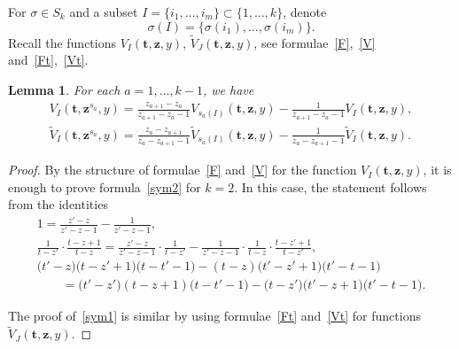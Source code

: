 \documentclass[10pt,a4paper]{amsart}
\numberwithin{equation}{section}
\newtheorem{Lemma}[Theorem]{Lemma}
\begin{document}
For $\sigma\in S_k$ and a subset $I=\{i_1,\dots,i_m\}\subset\{1,\dots,k\}$, denote
\begin{equation*}\sigma (I)=\{\sigma(i_1),\dots,\sigma(i_m)\}.\end{equation*}
Recall the functions $V_I(\boldsymbol{t},\boldsymbol{z},y)$, $\widetilde{V}_J(\boldsymbol{t},\boldsymbol{z},y)$, see formulae~\eqref{F},~\eqref{V} and~\eqref{Ft},~\eqref{Vt}.

\begin{Lemma}
For each $a=1,\dots, k-1$, we have
\begin{gather}\label{sym2}
V_{I}(\boldsymbol{t},\boldsymbol{z}^{s_a}\!,y)=\frac{z_{a+1}-z_a}{z_{a+1}-z_{a}-1}V_{s_a(I)}(\boldsymbol{t},\boldsymbol{z},y)-\frac{1}{z_{a+1}-z_{a}-1}V_{I}(\boldsymbol{t},\boldsymbol{z},y),
\\ \label{sym1}
\widetilde{V}_I(\boldsymbol{t},\boldsymbol{z}^{s_a}\!,y)=\frac{z_a-z_{a+1}}{z_a-z_{a+1}-1}\widetilde{V}_{s_a(I)}(\boldsymbol{t},\boldsymbol{z},y)-\frac{1}{z_a-z_{a+1}-1}\widetilde{V}_I(\boldsymbol{t},\boldsymbol{z},y).
\end{gather}
\end{Lemma}

\begin{proof}
By the structure of formulae~\eqref{F} and~\eqref{V} for the function $V_I(\boldsymbol{t},\boldsymbol{z},y)$, it is enough to prove formula~\eqref{sym2} for $k=2$. In this case, the statement follows from the identities
\begin{gather*}
1=\frac{z'-z}{z'-z-1}-\frac{1}{z'-z-1},
\\
\frac{1}{t-z'}\cdot\frac{t-z+1}{t-z}=\frac{z'-z}{z'-z-1}\cdot\frac{1}{t-z'}-\frac{1}{z'-z-1}\cdot\frac{1}{t-z}\cdot\frac{t-z'+1}{t-z'},
\\
\bigl(t'-z\bigr)\bigl(t-z'+1\bigr)\bigl(t-t'-1\bigr)-(t-z)\bigl(t'-z'+1\bigr)\bigl(t'-t-1\bigr)\\
\qquad{}=\bigl(t'-z'\bigr)(t-z+1)\bigl(t-t'-1\bigr)-\bigl(t-z'\bigr)\bigl(t'-z+1\bigr)\bigl(t'-t-1\bigr).
\end{gather*}

The proof of~\eqref{sym1} is similar by using formulae~\eqref{Ft} and~\eqref{Vt} for functions $\widetilde{V}_J(\boldsymbol{t},\boldsymbol{z},y)$.
\end{proof}
\end{document}
